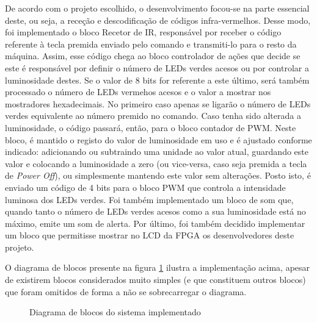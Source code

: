 \documentclass[a4paper,11pt,openright,oneside]{report}
\begin{document}
De acordo com o projeto escolhido, o desenvolvimento focou-se na parte essencial deste, ou seja, a receção e descodificação de códigos infra-vermelhos. Desse modo, foi implementado o bloco Recetor de IR, responsável por receber o código referente à tecla premida enviado pelo comando e transmiti-lo para o resto da máquina. Assim, esse código chega ao bloco controlador de ações que decide se este é responsável por definir o número de LEDs verdes acesos ou por controlar a luminosidade destes. Se o valor de 8 bits for referente a este último, será também processado o número de LEDs vermehos acesos e o valor a mostrar nos mostradores hexadecimais.
No primeiro caso apenas se ligarão o número de LEDs verdes equivalente ao número premido no comando. Caso tenha sido alterada a luminosidade, o código passará, então, para o bloco contador de PWM. Neste bloco, é mantido o registo do valor de luminosidade em uso e é ajustado conforme indicado: adicionando ou subtraindo uma unidade ao valor atual, guardando este valor e colocando a luminosidade a zero (ou vice-versa, caso seja premida a tecla de \textit{Power Off}), ou simplesmente mantendo este valor sem alterações. Posto isto, é enviado um código de 4 bits para o bloco PWM que controla a intensidade luminosa dos LEDs verdes. Foi também implementado um bloco de som que, quando tanto o número de LEDs verdes acesos como a sua luminosidade está no máximo, emite um som de alerta. Por último, foi também decidido implementar um bloco que permitisse mostrar no LCD da FPGA os desenvolvedores deste projeto.

O diagrama de blocos presente na figura \ref{fig:ir_leds0} ilustra a implementação acima, apesar de existirem blocos considerados muito simples (e que constituem outros blocos) que foram omitidos de forma a não se sobrecarregar o diagrama.

\begin{figure}[ht]
\center
{}
\caption{Diagrama de blocos do sistema implementado}
\label{fig:ir_leds0}
\end{figure}
\end{document}
